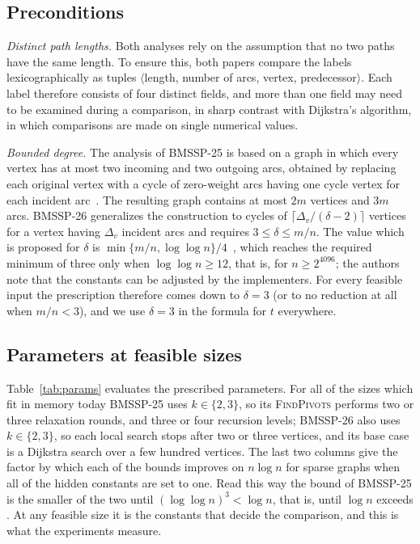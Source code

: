 \documentclass[conference,a4paper]{IEEEtran}
\newcommand{\bmA}{BMSSP-25}
\newcommand{\bmB}{BMSSP-26}
\newcommand{\fp}{\textsc{FindPivots}}
\begin{document}
\subsection{Preconditions}
\emph{Distinct path lengths.} Both analyses rely on the assumption that no two paths have the
same length. To ensure this, both papers compare the labels lexicographically as tuples
$\langle$length, number of arcs, vertex, predecessor$\rangle$. Each label therefore consists of
four distinct fields, and more than one field may need to be examined during a comparison, in
sharp contrast with Dijkstra's algorithm, in which comparisons are made on single numerical
values.

\emph{Bounded degree.} The analysis of \bmA{} is based on a graph in which every vertex has at
most two incoming and two outgoing arcs, obtained by replacing each original vertex with a cycle
of zero-weight arcs having one cycle vertex for each incident arc~\cite{duan2025,frederickson1983}.
The resulting graph contains at most $2m$ vertices and $3m$ arcs. \bmB{} generalizes the
construction to cycles of
$\lceil\Delta_v/(\delta-2)\rceil$ vertices for a vertex having $\Delta_v$ incident arcs and
requires $3\le\delta\le m/n$. The value which is proposed for $\delta$ is $\min\{m/n,\log\log
n\}/4$~\cite{duan2026}, which reaches the required minimum of three only when $\log\log n\ge 12$,
that is, for $n\ge 2^{4096}$; the authors note that the constants can be adjusted by the
implementers. For every feasible input the prescription therefore comes down to $\delta=3$ (or
to no reduction at all when $m/n<3$), and we use $\delta=3$ in the formula for $t$ everywhere.

\subsection{Parameters at feasible sizes}
Table~\ref{tab:params} evaluates the prescribed parameters. For all of the sizes which fit in
memory today \bmA{} uses $k\in\{2,3\}$, so its \fp{} performs two or three relaxation rounds,
and three or four recursion levels; \bmB{} also uses $k\in\{2,3\}$, so each local search stops
after two or three vertices, and its base case is a Dijkstra search over a few hundred vertices.
The last two columns give the factor by which each of the bounds improves on $n\log n$ for
sparse graphs when all of the hidden constants are set to one. Read this way the bound of \bmA{}
is the smaller of the two until $(\log\log n)^3<\log n$, that is, until $\log n$ exceeds
\FaceValueCrossLog{}. At any feasible size it is the constants that decide the comparison, and
this is what the experiments measure.
\end{document}
